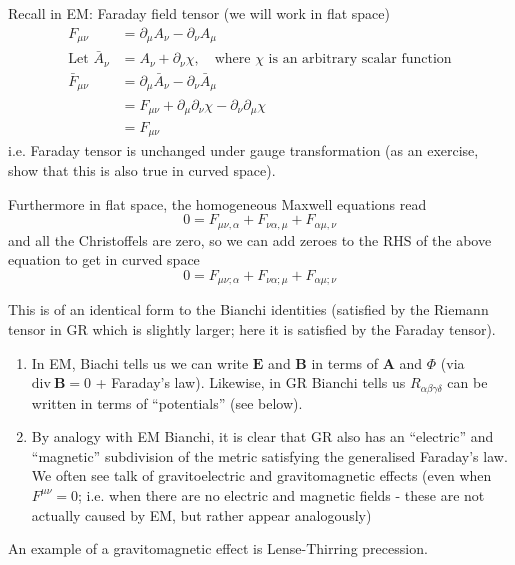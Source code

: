 \documentclass[a4paper]{article} %
\newcommand{\vect}[1]{\mathbf{#1}} %
\renewcommand{\div}{\text{div}~}
\begin{document}
Recall in EM:
Faraday field tensor (we will work in flat space)
\begin{align}
F_{\mu\nu}&=\partial_{\mu} A_{\nu} - \partial_{\nu} A_{\mu}\\
\text{Let } \bar{A}_{\nu}&=A_{\nu}+\partial_{\nu} \chi,\quad\text{where $\chi$ is an arbitrary scalar function}\\
\bar{F}_{\mu\nu}&=\partial_\mu \bar{A}_\nu - \partial_\nu \bar{A}_\mu\\
&= F_{\mu\nu}+\partial_\mu \partial_\nu \chi - \partial_\nu \partial_\mu \chi\\
&=F_{\mu\nu}
\end{align}
i.e. Faraday tensor is unchanged under gauge transformation (as an exercise, show that this is also true in curved space).

Furthermore in flat space, the homogeneous Maxwell equations read
\begin{equation}
0=F_{\mu\nu,\alpha}+F_{\nu\alpha,\mu} + F_{\alpha\mu,\nu}
\end{equation}
and all the Christoffels are zero, so we can add zeroes to the RHS of the above equation to get in curved space
\begin{equation}
 0=F_{\mu\nu;\alpha}+F_{\nu\alpha;\mu} + F_{\alpha\mu;\nu}
\end{equation}

This is of an identical form to the Bianchi identities (satisfied by the Riemann tensor in GR which is slightly larger; here it is satisfied by the Faraday tensor).

\begin{enumerate}
\item In EM, Biachi tells us we can write $\vect{E}$ and $\vect{B}$ in terms of $\vect{A}$ and $\Phi$ (via $\div \vect{B}=0$ + Faraday's law). Likewise, in GR Bianchi tells us $R_{\alpha\beta\gamma\delta}$ can be written in terms of ``potentials'' (see below).

\item By analogy with EM Bianchi, it is clear that GR also has an ``electric'' and ``magnetic'' subdivision of the metric satisfying the generalised Faraday's law. We often see talk of gravitoelectric and gravitomagnetic effects (even when $F^{\mu\nu}=0$; i.e. when there are no electric and magnetic fields - these are not actually caused by EM, but rather appear analogously)
\end{enumerate}

An example of a gravitomagnetic effect is Lense-Thirring precession.
\end{document}
